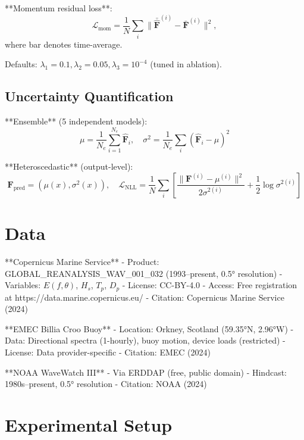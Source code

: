 \documentclass[journal,article,accept]{mdpi}
\newcommand{\cL}{\mathcal{L}}
\newcommand{\Hs}{H_s}
\newcommand{\Tp}{T_p}
\begin{document}
**Momentum residual loss**:
\begin{equation}
\cL_{\text{mom}} = \frac{1}{N}\sum_i \| \bar{\hat{\mathbf{F}}}^{(i)} - \bar{\mathbf{F}}^{(i)} \|^2,
\end{equation}
where bar denotes time-average.

Defaults: $\lambda_1 = 0.1, \lambda_2 = 0.05, \lambda_3 = 10^{-4}$ (tuned in ablation).

\subsection{Uncertainty Quantification}

**Ensemble** (5 independent models):
\begin{equation}
\mu = \frac{1}{N_e}\sum_{i=1}^{N_e} \hat{\mathbf{F}}_i, \quad \sigma^2 = \frac{1}{N_e}\sum_i (\hat{\mathbf{F}}_i - \mu)^2
\end{equation}

**Heteroscedastic** (output-level):
\begin{equation}
\mathbf{F}_{\text{pred}} = (\mu(x), \sigma^2(x)), \quad \cL_{\text{NLL}} = \frac{1}{N}\sum_i \left[ \frac{\|\mathbf{F}^{(i)}-\mu^{(i)}\|^2}{2\sigma^{2(i)}} + \frac{1}{2}\log \sigma^{2(i)} \right]
\end{equation}

\section{Data}
\label{sec:data}

**Copernicus Marine Service**
- Product: GLOBAL_REANALYSIS_WAV_001_032 (1993--present, 0.5° resolution)
- Variables: $E(f,\theta)$, $\Hs$, $\Tp$, $D_p$
- License: CC-BY-4.0
- Access: Free registration at https://data.marine.copernicus.eu/
- Citation: Copernicus Marine Service (2024)

**EMEC Billia Croo Buoy**
- Location: Orkney, Scotland (59.35°N, 2.96°W)
- Data: Directional spectra (1-hourly), buoy motion, device loads (restricted)
- License: Data provider-specific
- Citation: EMEC (2024)

**NOAA WaveWatch III**
- Via ERDDAP (free, public domain)
- Hindcast: 1980s--present, 0.5° resolution
- Citation: NOAA (2024)

\section{Experimental Setup}
\label{sec:experiments}
\end{document}
